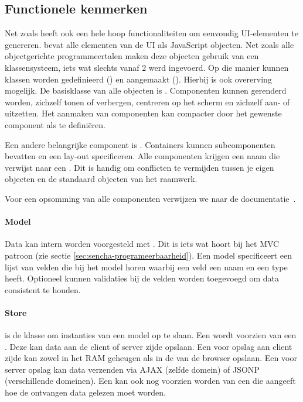 \subsection{Functionele kenmerken}
Net zoals \jqm{} heeft \st{} ook een hele hoop functionaliteiten om eenvoudig UI-elementen te genereren.  
\st{} bevat alle elementen van de UI als JavaScript objecten.  
Net zoals alle objectgerichte programmeertalen maken deze objecten gebruik van een klassensysteem,  iets wat slechts vanaf \st{} 2 werd ingevoerd.  
Op die manier kunnen klassen worden gedefinieerd () en aangemaakt ().  
Hierbij is ook overerving mogelijk.  
De basisklasse van alle objecten is .  
Componenten kunnen gerenderd worden, zichzelf tonen of verbergen,  centreren op het scherm en zichzelf aan- of uitzetten.   
Het aanmaken van componenten kan compacter door het gewenste component als  te definiëren.  

Een andere belangrijke component is .  
Containers kunnen subcomponenten bevatten en een lay-out specificeren.  
Alle componenten krijgen een naam die verwijst naar een .  
Dit is handig om conflicten te vermijden tussen je eigen objecten en de standaard objecten van het raamwerk.  

Voor een opsomming van alle componenten verwijzen we naar de documentatie~\cite{Inc.2013a}.


\paragraph{Model}
Data kan intern worden voorgesteld met .  
Dit is iets wat hoort bij het MVC patroon (zie sectie \ref{sec:sencha-programeerbaarheid}).  
Een model specificeert een lijst van velden die bij het model horen waarbij een veld een naam en een type heeft.  
Optioneel kunnen validaties bij de velden worden toegevoegd om data consistent te houden.  

\paragraph{Store}
 is de klasse om instanties van een model op te slaan.  
Een  wordt voorzien van een .  
Deze kan data aan de client of server zijde opslaan.  
Een  voor opslag aan client zijde kan zowel in het RAM geheugen als in de  van de browser opslaan.  
Een  voor server opslag kan data verzenden via AJAX (zelfde domein) of JSONP (verschillende domeinen).  
Een  kan ook nog voorzien worden van een  die aangeeft hoe de ontvangen data gelezen moet worden.

